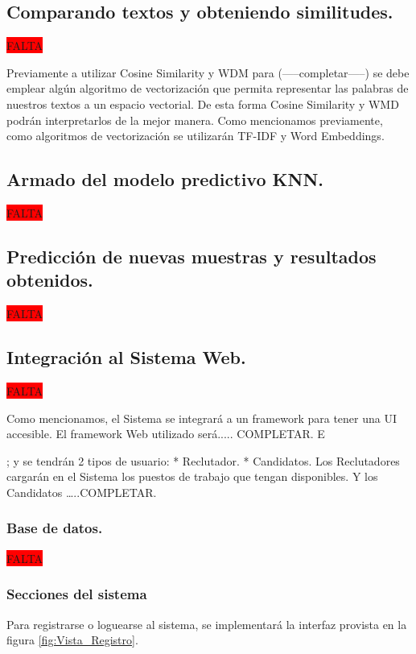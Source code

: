 \documentclass[12pt,a4paper]{article}
\begin{document}
\subsection{Comparando textos y obteniendo similitudes.}
\colorbox{red}{FALTA}

Previamente a utilizar Cosine Similarity y WDM para (-----completar-----) se debe emplear algún algoritmo de vectorización que permita representar las palabras de nuestros textos a un espacio vectorial. De esta forma Cosine Similarity y WMD podrán interpretarlos de la mejor manera. 
Como mencionamos previamente, como algoritmos de vectorización se utilizarán TF-IDF y Word Embeddings.


\subsection{Armado del modelo predictivo KNN.}
\colorbox{red}{FALTA}

\subsection{Predicción de nuevas muestras y resultados obtenidos.}
\colorbox{red}{FALTA}

\subsection{Integración al Sistema Web.}
\colorbox{red}{FALTA}

Como mencionamos, el Sistema se integrará a un framework para tener una UI accesible.
El framework Web utilizado será..... COMPLETAR.
E


; y se tendrán 2 tipos de usuario: 
*  Reclutador. 
*  Candidatos.
Los Reclutadores cargarán en el Sistema los puestos de trabajo que tengan disponibles.
Y los Candidatos …..COMPLETAR.


\subsubsection{Base de datos.}
\colorbox{red}{FALTA}

\subsubsection{Secciones del sistema}

Para registrarse o loguearse al sistema, se implementará la interfaz provista en la figura \ref{fig:Vista_Registro}.
\end{document}
